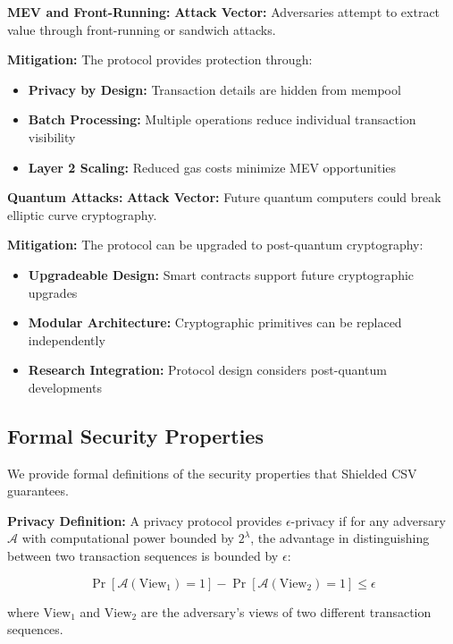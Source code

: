 \documentclass[11pt,a4paper]{article}
\begin{document}
\textbf{MEV and Front-Running:}
\textbf{Attack Vector:} Adversaries attempt to extract value through front-running or sandwich attacks.

\textbf{Mitigation:} The protocol provides protection through:
\begin{itemize}
    \item \textbf{Privacy by Design:} Transaction details are hidden from mempool
    \item \textbf{Batch Processing:} Multiple operations reduce individual transaction visibility
    \item \textbf{Layer 2 Scaling:} Reduced gas costs minimize MEV opportunities
\end{itemize}

\textbf{Quantum Attacks:}
\textbf{Attack Vector:} Future quantum computers could break elliptic curve cryptography.

\textbf{Mitigation:} The protocol can be upgraded to post-quantum cryptography:
\begin{itemize}
    \item \textbf{Upgradeable Design:} Smart contracts support future cryptographic upgrades
    \item \textbf{Modular Architecture:} Cryptographic primitives can be replaced independently
    \item \textbf{Research Integration:} Protocol design considers post-quantum developments
\end{itemize}

\subsection{Formal Security Properties}

We provide formal definitions of the security properties that Shielded CSV guarantees.

\textbf{Privacy Definition:}
A privacy protocol provides $\epsilon$-privacy if for any adversary $\mathcal{A}$ with computational power bounded by $2^\lambda$, the advantage in distinguishing between two transaction sequences is bounded by $\epsilon$:

\begin{equation}
\Pr[\mathcal{A}(\text{View}_1) = 1] - \Pr[\mathcal{A}(\text{View}_2) = 1] \leq \epsilon
\end{equation}

where $\text{View}_1$ and $\text{View}_2$ are the adversary's views of two different transaction sequences.
\end{document}
